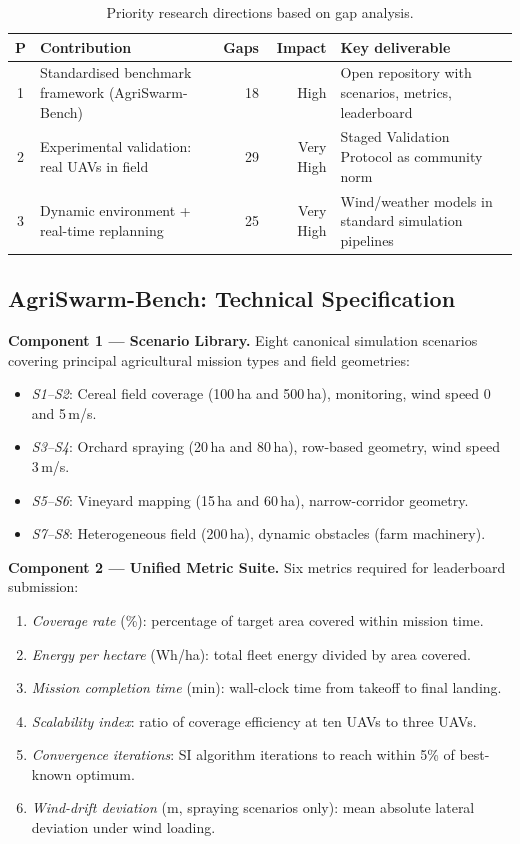 \documentclass[review,3p]{elsarticle}
\begin{document}
\begin{table}[htbp]
\centering
\caption{Priority research directions based on gap analysis.}
\label{tab:priorities}
\begin{tabularx}{\textwidth}{clrr>{\raggedright\arraybackslash}X}
\toprule
\textbf{P} & \textbf{Contribution} & \textbf{Gaps} & \textbf{Impact} & \textbf{Key deliverable} \\
\midrule
1 & Standardised benchmark framework (AgriSwarm-Bench) & 18 & High      & Open repository with scenarios, metrics, leaderboard \tabularnewline
2 & Experimental validation: real UAVs in field         & 29 & Very High & Staged Validation Protocol as community norm \tabularnewline
3 & Dynamic environment + real-time replanning          & 25 & Very High & Wind/weather models in standard simulation pipelines \tabularnewline
\bottomrule
\end{tabularx}
\end{table}

\subsection{AgriSwarm-Bench: Technical Specification}

\textbf{Component 1 --- Scenario Library.} Eight canonical simulation scenarios
covering principal agricultural mission types and field geometries:
\begin{itemize}
  \item \textit{S1--S2}: Cereal field coverage (100\,ha and 500\,ha), monitoring, wind speed 0 and 5\,m/s.
  \item \textit{S3--S4}: Orchard spraying (20\,ha and 80\,ha), row-based geometry, wind speed 3\,m/s.
  \item \textit{S5--S6}: Vineyard mapping (15\,ha and 60\,ha), narrow-corridor geometry.
  \item \textit{S7--S8}: Heterogeneous field (200\,ha), dynamic obstacles (farm machinery).
\end{itemize}

\textbf{Component 2 --- Unified Metric Suite.} Six metrics required for leaderboard submission:
\begin{enumerate}
  \item \textit{Coverage rate} (\%): percentage of target area covered within mission time.
  \item \textit{Energy per hectare} (Wh/ha): total fleet energy divided by area covered.
  \item \textit{Mission completion time} (min): wall-clock time from takeoff to final landing.
  \item \textit{Scalability index}: ratio of coverage efficiency at ten UAVs to three UAVs.
  \item \textit{Convergence iterations}: SI algorithm iterations to reach within 5\% of best-known optimum.
  \item \textit{Wind-drift deviation} (m, spraying scenarios only): mean absolute lateral deviation under wind loading.
\end{enumerate}
\end{document}

